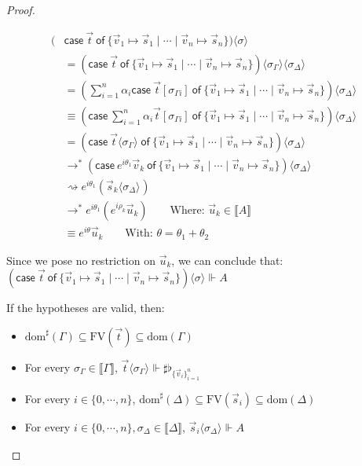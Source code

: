 \documentclass[a4paper,UKenglish,numberwithinsect,pdfa,anonymous]{lipics-v2021}
\theoremstyle{restatestyle}
\newcommand\lra{\longrightarrow}
\newcommand\ansubst[2]{\ensuremath{\langle #1 \rangle_{#2}}}
\newcommand\dom[1]{\mathrm{dom}(#1)}
\newcommand\sdom[1]{\mathrm{dom}^{\sharp}(#1)}
\newcommand\FV[1]{\mathrm{FV}(#1)}
\def\gencase#1#2#3#4#5{\ensuremath{\mathsf{case}~#1~\mathsf{of}~\{#2\mapsto #4 \mid \dotsb \mid #3\mapsto #5\}}}
\def\lraneq{\rightsquigarrow}
\def\eval{\lra^*}
\def\sem#1{\llbracket#1\rrbracket}
\def\real{\Vdash}
\newcommand\basis[1]{\ensuremath{\flat_{#1}}}
\newcommand\genbasis[3]{\ensuremath{\basis{\{#1\}_{#2}^{#3}}}}
\begin{document}
\begin{proof}
\begin{description}
    \begin{align*}
        (&\gencase{\vec{t}}{\vec{v}_{1}}{\vec{v}_{n}}{\vec{s}_{1}}{\vec{s}_{n}})\ansubst{\sigma}{}\\ 
        &= (\gencase{\vec{t}}{\vec{v}_{1}}{\vec{v}_{n}}{\vec{s}_{1}}{\vec{s}_{n}})\ansubst{\sigma_\Gamma}{}\ansubst{\sigma_\Delta}{}\\
        &= (\sum_{i=1}^{n}\alpha_i \gencase{\vec{t}[\sigma_{\Gamma i}]}{\vec{v}_{1}}{\vec{v}_{n}}{\vec{s}_{1}}{\vec{s}_{n}})\ansubst{\sigma_\Delta}{} \\
        &\equiv (\gencase{\sum_{i=1}^{n} \alpha_i \vec{t}[\sigma_{\Gamma i}]}{\vec{v}_{1}}{\vec{v}_{n}}{\vec{s}_{1}}{\vec{s}_{n}})\ansubst{\sigma_\Delta}{}\\
        &=(\gencase{\vec{t}\ansubst{\sigma_\Gamma}{}}{\vec{v}_{1}}{\vec{v}_{n}}{\vec{s}_{1}}{\vec{s}_{n}})\ansubst{\sigma_\Delta}{}\\
        &\eval(\gencase{e^{i\theta_1}\vec{v}_{k}}{\vec{v}_{1}}{\vec{v}_{n}}{\vec{s}_{1}}{\vec{s}_{n}})\ansubst{\sigma_\Delta}{}\\
        &\lraneq e^{i\theta_1}(\vec{s}_{k}\ansubst{\sigma_\Delta}{})\\
        &\eval e^{i\theta_1}(e^{i\rho_k} \vec{u}_{k})\qquad\text{Where: }\vec{u}_{k}\in\sem{A}\\
        &\equiv e^{i\theta} \vec{u}_{k}\qquad\text{With: }\theta=\theta_1 +\theta_2
    \end{align*}
    
    Since we pose no restriction on $\vec{u}_k$, we can conclude that: $(\gencase{\vec{t}}{\vec{v}_{1}}{\vec{v}_{n}}{\vec{s}_{1}}{\vec{s}_{n}})\ansubst{\sigma}{}\real A$

    \item[UnitCase] If the hypotheses are valid, then:
    \begin{itemize}
        \item $\sdom{\Gamma}\subseteq \FV{\vec{t}}\subseteq \dom{\Gamma}$
        \item For every $\sigma_\Gamma\in\sem{\Gamma}$, $\vec{t}\ansubst{\sigma_\Gamma}{}\real\sharp\genbasis{\vec{v}_{i}}{i=1}{n}$
        \item For every $i\in\{0,\dotsb ,n\}$, $\sdom{\Delta}\subseteq \FV{\vec{s}_{i}}\subseteq \dom{\Delta}$
        \item For every $i\in\{0,\dotsb ,n\}, \sigma_\Delta\in\sem{\Delta}$, $\vec{s}_{i}\ansubst{\sigma_\Delta}{}\real A$
    \end{itemize}
    

\end{description}
\end{proof}
\end{document}
